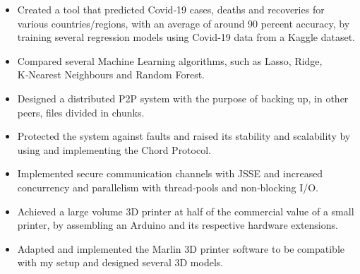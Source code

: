 \documentclass[10pt,a4paper]{altacv}
\begin{document}

\begin{itemize}
    \item Created a tool that predicted Covid‑19 cases, deaths and recoveries for various countries/regions, with an average of around 90 percent accuracy, by training several regression models using Covid‑19 data from a Kaggle dataset.
    \item Compared several Machine Learning algorithms, such as Lasso, Ridge, K‑Nearest Neighbours and Random Forest.
\end{itemize}

\vspace{2mm}

\begin{itemize}
    \item Designed a distributed P2P system with the purpose of backing up, in other peers, files divided in chunks.
    \item Protected the system against faults and raised its stability and scalability by using and implementing the Chord Protocol.
    \item Implemented secure communication channels with JSSE and increased concurrency and parallelism with thread‑pools and non‑blocking I/O.
\end{itemize}

\vspace{2mm}

\begin{itemize}
    \item Achieved a large volume 3D printer at half of the commercial value of a small printer, by assembling an Arduino and its respective hardware extensions.
    \item Adapted and implemented the Marlin 3D printer software to be compatible with my setup and designed several 3D models.
\end{itemize}

\clearpage


\end{document}
